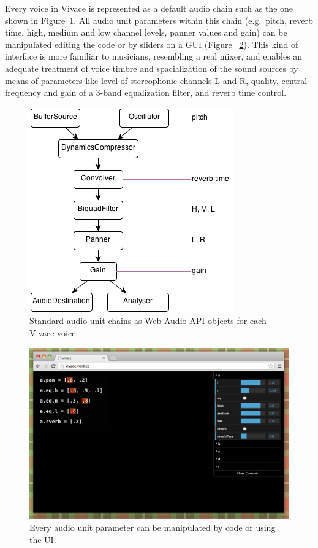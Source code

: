 \documentclass[letterpaper, 12pt]{article}
\begin{document}
{Every voice in Vivace is represented as a default audio chain such as
the one shown in Figure~\ref{fig:chain}. All audio unit parameters
within this chain (e.g.\ pitch, reverb time, high, medium and low
channel levels, panner values and gain) can be manipulated editing the
code or by sliders on a GUI (Figure ~\ref{fig:ui}). This kind of
interface is more familiar to musicians, resembling a real mixer, and
enables an adequate treatment of voice timbre and spacialization of
the sound sources by means of parameters like level of stereophonic
channels L and R, quality, central frequency and gain of a 3-band
equalization filter, and reverb time control.

\begin{figure}[htpb]
  \begin{center}
    \includegraphics[scale=.5]{img/fig_chain.png}
    \caption{Standard audio unit chains as Web Audio API objects for
      each Vivace voice.}
    \label{fig:chain}
  \end{center}
\end{figure}

\begin{figure}[htpb]
  \begin{center}
    \includegraphics[scale=.4]{img/fig_ui.png}
    \caption{Every audio unit parameter can be manipulated by code or
      using the UI.}
    \label{fig:ui}
  \end{center}
\end{figure}

}
\end{document}
